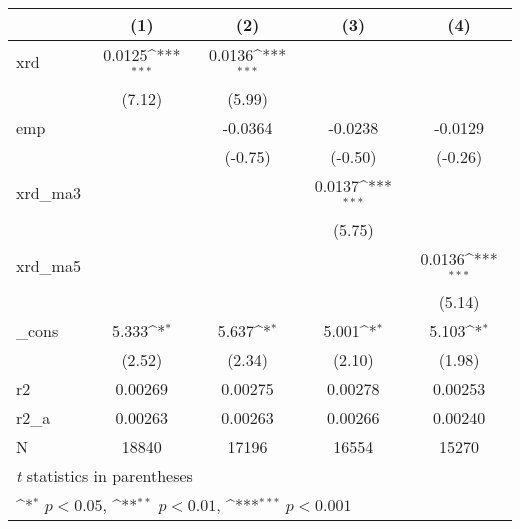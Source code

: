 {
\def\sym#1{\ifmmode^{#1}\else\(^{#1}\)\fi}
\begin{tabular}{l*{4}{c}}
\hline\hline
            &\multicolumn{1}{c}{(1)}         &\multicolumn{1}{c}{(2)}         &\multicolumn{1}{c}{(3)}         &\multicolumn{1}{c}{(4)}         \\
\hline
xrd         &      0.0125\sym{***}&      0.0136\sym{***}&                     &                     \\
            &      (7.12)         &      (5.99)         &                     &                     \\
[1em]
emp         &                     &     -0.0364         &     -0.0238         &     -0.0129         \\
            &                     &     (-0.75)         &     (-0.50)         &     (-0.26)         \\
[1em]
xrd\_ma3     &                     &                     &      0.0137\sym{***}&                     \\
            &                     &                     &      (5.75)         &                     \\
[1em]
xrd\_ma5     &                     &                     &                     &      0.0136\sym{***}\\
            &                     &                     &                     &      (5.14)         \\
[1em]
\_cons      &       5.333\sym{*}  &       5.637\sym{*}  &       5.001\sym{*}  &       5.103\sym{*}  \\
            &      (2.52)         &      (2.34)         &      (2.10)         &      (1.98)         \\
\hline
r2          &     0.00269         &     0.00275         &     0.00278         &     0.00253         \\
r2\_a        &     0.00263         &     0.00263         &     0.00266         &     0.00240         \\
N           &       18840         &       17196         &       16554         &       15270         \\
\hline\hline
\multicolumn{5}{l}{\footnotesize \textit{t} statistics in parentheses}\\
\multicolumn{5}{l}{\footnotesize \sym{*} \(p<0.05\), \sym{**} \(p<0.01\), \sym{***} \(p<0.001\)}\\
\end{tabular}
}
